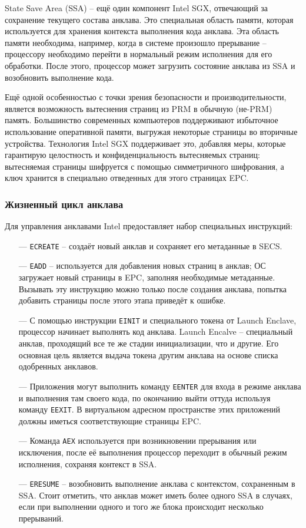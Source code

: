 State Save Area (SSA) -- ещё один компонент Intel SGX, отвечающий за сохранение текущего состава анклава. Это специальная область памяти, которая используется для хранения контекста выполнения кода анклава. Эта область памяти необходима, например, когда в системе произошло прерывание -- процессору необходимо перейти в нормальный режим исполнения для его обработки. После этого, процессор может загрузить состояние анклава из SSA и возобновить выполнение кода.

Ещё одной особенностью с точки зрения безопасности и производительности, является возможность вытеснения страниц из PRM в обычную (не-PRM) память. Большинство современных компьютеров поддерживают избыточное использование оперативной памяти, выгружая некоторые страницы во вторичные устройства. Технология Intel SGX поддерживает это, добавляя меры, которые гарантирую целостность и конфиденциальность вытесняемых страниц: вытесняемая страницы шифруется с помощью симметричного шифрования, а ключ хранится в специально отведенных для этого страницах EPC.

\subsubsection{Жизненный цикл анклава}

Для управления анклавами Intel предоставляет набор специальных инструкций:

\begin{itemize}
	\item [---] \texttt{ECREATE} -- создаёт новый анклав и сохраняет его метаданные в SECS.
	\item [---] \texttt{EADD} -- используется для добавления новых страниц в анклав; ОС загружает новый страницы в EPC, заполняя необходимые метаданные. Вызывать эту инструкцию можно только после создания анклава, попытка добавить страницы после этого этапа приведёт к ошибке.
	\item [---] С помощью инструкции \texttt{EINIT} и специального токена от Launch Enclave, процессор начинает выполнять код анклава. Launch Encalve -- специальный анклав, проходящий все те же стадии инициализации, что и другие. Его основная цель является выдача токена другим анклава на основе списка одобренных анклавов.
	\item [---] Приложения могут выполнить команду \texttt{EENTER} для входа в режиме анклава и выполнения там своего кода, по окончанию выйти оттуда используя команду \texttt{EEXIT}. В виртуальном адресном пространстве этих приложений должны иметься соответствующие страницы EPC.
	\item [---] Команда \texttt{AEX} используется при возникновении прерывания или исключения, после её выполнения процессор переходит в обычный режим исполнения, сохраняя контекст в SSA.
	\item [---] \texttt{ERESUME} -- возобновить выполнение анклава с контекстом, сохраненным в SSA. Стоит отметить, что анклав может иметь более одного SSA в случаях, если при выполнении одного и того же блока происходит несколько прерываний.
\end{itemize}

